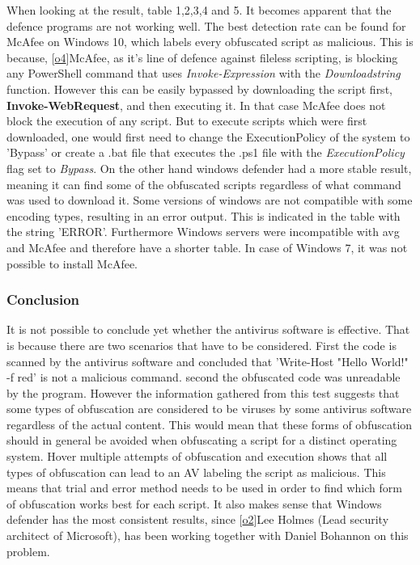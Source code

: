 \documentclass{article}%
\begin{document}
When looking at the result, table 1,2,3,4 and 5. It becomes apparent that the defence programs are not working well. The best detection rate can be found for McAfee on Windows 10, which labels every obfuscated script as malicious. This is because, [\hyperlink{o4}{o4}]McAfee, as it's line of defence against fileless scripting, is blocking any PowerShell command that uses \textit{Invoke-Expression} with the \textit{Downloadstring} function. However this can be easily bypassed by downloading the script first, \textbf{Invoke-WebRequest}, and then executing it. In that case McAfee does not block the execution of any script. But to execute scripts which were first downloaded, one would first need to change the ExecutionPolicy of the system to 'Bypass' or create a .bat file that executes the .ps1 file with the \textit{ExecutionPolicy} flag set to \textit{Bypass}. On the other hand windows defender had a more stable result, meaning it can find some of the obfuscated scripts regardless of what command was used to download it. Some versions of windows are not compatible with some encoding types, resulting in an error output. This is indicated in the table with the string 'ERROR'. Furthermore Windows servers were incompatible with avg and McAfee and therefore have a shorter table. In case of Windows 7, it was not possible to install McAfee.
\subsubsection{Conclusion}
It is not possible to conclude yet whether the antivirus software is effective. That is because there are two scenarios that have to be considered. First the code is scanned by the antivirus software and concluded that 'Write-Host "Hello World!" -f red' is not a malicious command. second the obfuscated code was unreadable by the program. However the information gathered from this test suggests that some types of obfuscation are considered to be viruses by some antivirus software regardless of the actual content. This would mean that these forms of obfuscation should in general be avoided when obfuscating a script for a distinct operating system. Hover multiple attempts of obfuscation and execution shows that all types of obfuscation can lead to an AV labeling the script as malicious. This means that trial and error method needs to be used in order to find which form of obfuscation works best for each script. It also makes sense that Windows defender has the most consistent results, since [\hyperlink{o2}{o2}]Lee Holmes (Lead security architect of Microsoft), has been working together with Daniel Bohannon on this problem.
\end{document}
